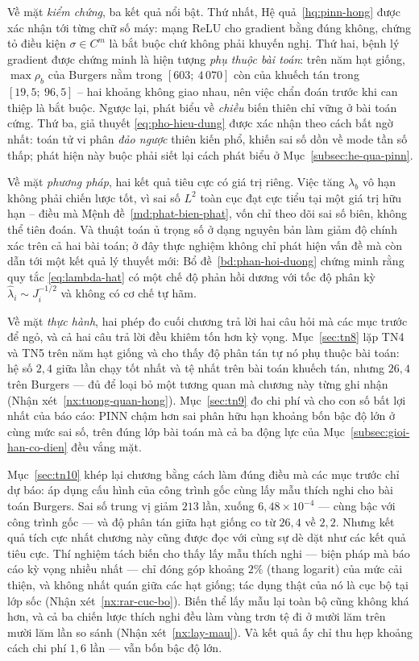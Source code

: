 Về mặt \emph{kiểm chứng}, ba kết quả nổi bật. Thứ nhất,
Hệ quả~\ref{hq:pinn-hong} được xác nhận tới từng chữ số máy: mạng ReLU cho
gradient bằng đúng không, chứng tỏ điều kiện $\sigma \in C^m$ là bắt buộc chứ
không phải khuyến nghị. Thứ hai, bệnh lý gradient được chứng minh là hiện tượng
\emph{phụ thuộc bài toán}: trên năm hạt giống, $\max\rho_b$ của Burgers nằm trong
$[603;\ 4\,070]$ còn của khuếch tán trong $[19{,}5;\ 96{,}5]$ -- hai khoảng
không giao nhau, nên việc chẩn đoán trước khi can thiệp là bắt buộc. Ngược lại,
phát biểu về \emph{chiều} biến thiên chỉ vững ở bài toán cứng. Thứ ba, giả thuyết \eqref{eq:pho-hieu-dung} được xác nhận theo
cách bất ngờ nhất: toán tử vi phân \emph{đảo ngược} thiên kiến phổ, khiến sai số
dồn về mode tần số thấp; phát hiện này buộc phải siết lại cách phát biểu ở
Mục~\ref{subsec:he-qua-pinn}.
 
Về mặt \emph{phương pháp}, hai kết quả tiêu cực có giá trị riêng. Việc tăng
$\lambda_b$ vô hạn không phải chiến lược tốt, vì sai số $L^2$ toàn cục đạt cực
tiểu tại một giá trị hữu hạn -- điều mà Mệnh đề~\ref{md:phat-bien-phat}, vốn chỉ
theo dõi sai số biên, không thể tiên đoán. Và thuật toán ủ trọng số ở dạng nguyên
bản làm giảm độ chính xác trên cả hai bài toán; ở đây thực nghiệm không chỉ phát
hiện vấn đề mà còn dẫn tới một kết quả lý thuyết mới:
Bổ đề~\ref{bd:phan-hoi-duong} chứng minh rằng quy tắc \eqref{eq:lambda-hat} có một
chế độ phản hồi dương với tốc độ phân kỳ $\hat\lambda_i \sim J_i^{-1/2}$ và không
có cơ chế tự hãm.
 
Về mặt \emph{thực hành}, hai phép đo cuối chương trả lời hai câu hỏi mà các mục
trước để ngỏ, và cả hai câu trả lời đều khiêm tốn hơn kỳ vọng. Mục~\ref{sec:tn8}
lặp TN4 và TN5 trên năm hạt giống và cho thấy độ phân tán tự nó phụ thuộc bài
toán: hệ số $2{,}4$ giữa lần chạy tốt nhất và tệ nhất trên bài toán khuếch tán,
nhưng $26{,}4$ trên Burgers --- đủ để loại bỏ một tương quan mà chương này từng
ghi nhận (Nhận xét~\ref{nx:tuong-quan-hong}). Mục~\ref{sec:tn9} đo chi phí và
cho con số bất lợi nhất của báo cáo: PINN chậm hơn sai phân hữu hạn khoảng bốn
bậc độ lớn ở cùng mức sai số, trên đúng lớp bài toán mà cả ba động lực của
Mục~\ref{subsec:gioi-han-co-dien} đều vắng mặt.

Mục~\ref{sec:tn10} khép lại chương bằng cách làm đúng điều mà các mục trước chỉ
dự báo: áp dụng cấu hình của công trình gốc cùng lấy mẫu thích nghi cho bài toán
Burgers. Sai số trung vị giảm $213$ lần, xuống $6{,}48\times10^{-4}$ --- cùng bậc
với công trình gốc --- và độ phân tán giữa hạt giống co từ $26{,}4$ về $2{,}2$.
Nhưng kết quả tích cực nhất chương này cũng được đọc với cùng sự dè dặt như các
kết quả tiêu cực. Thí nghiệm tách biến cho thấy lấy mẫu thích nghi --- biện pháp
mà báo cáo kỳ vọng nhiều nhất --- chỉ đóng góp khoảng $2\%$ (thang logarit) của
mức cải thiện, và không nhất quán giữa các hạt giống; tác dụng thật của nó là
cục bộ tại lớp sốc (Nhận xét~\ref{nx:rar-cuc-bo}). Biến thể lấy mẫu lại toàn bộ
cũng không khá hơn, và cả ba chiến lược thích nghi đều làm vùng trơn tệ đi ở
mười lăm trên mười lăm lần so sánh (Nhận xét~\ref{nx:lay-mau}). Và kết quả ấy chỉ thu hẹp
khoảng cách chi phí $1{,}6$ lần --- vẫn bốn bậc độ lớn.

